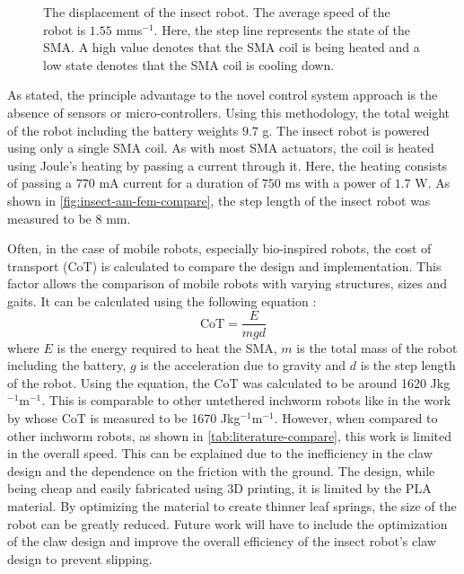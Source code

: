 \begin{figure}[hbt!] %
  \centering
  \resizebox{0.9\columnwidth}{!}{}
  \caption{The displacement of the insect robot. The average speed of the robot is $1.55$ mms$^{-1}$. Here, the step line represents the state of the SMA. A high value denotes that the SMA coil is being heated and a low state denotes that the SMA coil is cooling down.}
  \label{fig:insect-disp}
\end{figure}

As stated, the principle advantage to the novel control system approach is the absence of sensors or micro-controllers. Using this methodology, the total weight of the robot including the battery weights $9.7$ g. The insect robot is powered using only a single SMA coil. As with most SMA actuators, the coil is heated using Joule's heating by passing a current through it. Here, the heating consists of passing a $770$ mA current for a duration of $750$ ms with a power of $1.7$ W. As shown in \cref{fig:insect-am-fem-compare}, the step length of the insect robot was measured to be $8$ mm.

Often, in the case of mobile robots, especially bio-inspired robots, the cost of transport (CoT) is calculated to compare the design and implementation. This factor allows the comparison of mobile robots with varying structures, sizes and gaits. It can be calculated using the following equation :
\begin{equation}\label{eq:CoT}
    \textrm{CoT} = \frac{E}{mgd}
\end{equation}
where $E$ is the energy required to heat the SMA, $m$ is the total mass of the robot including the battery, $g$ is the acceleration due to gravity and $d$ is the step length of the robot. Using the equation, the CoT was calculated to be around 1620 Jkg$^{-1}$m$^{-1}$. This is comparable to other untethered inchworm robots like in the work by \cite{jiAutonomousUntetheredFast2019} whose CoT is measured to be 1670 Jkg$^{-1}$m$^{-1}$. However, when compared to other inchworm robots, as shown in \cref{tab:literature-compare}, this work is limited in the overall speed. This can be explained due to the inefficiency in the claw design and the dependence on the friction with the ground. The design, while being cheap and easily fabricated using 3D printing, it is limited by the PLA material. By optimizing the material to create thinner leaf springs, the size of the robot can be greatly reduced. Future work will have to include the optimization of the claw design and improve the overall efficiency of the insect robot's claw design to prevent slipping.

